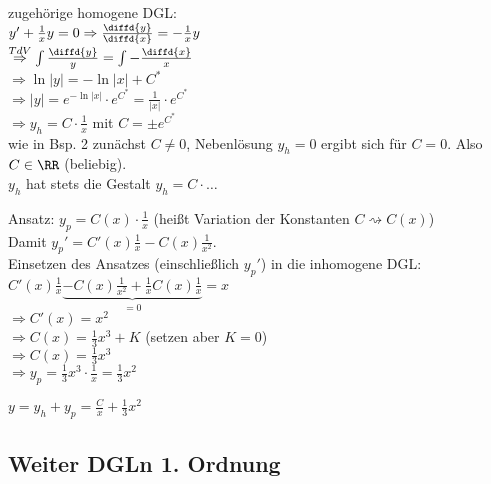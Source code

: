 \begin{anumerate}
\item zugehörige homogene DGL:\\
$y'+\frac{1}{x}y=0 \Rightarrow \frac{\diffd{y}}{\diffd{x}}=-\frac{1}{x}y$\\
$\overset{TdV}{\Rightarrow} \int \frac{\diffd{y}}{y}=\int - \frac{\diffd{x}}{x}$\\
$\Rightarrow \ln |y| = - \ln | x | + C^*$\\
$\Rightarrow |y| = e^{-\ln |x|}\cdot e^{C^*}=\frac{1}{|x|}\cdot e^{C^*}$\\
$\Rightarrow y_h = C\cdot \frac{1}{x}$ mit $C = \pm e^{C^*}$\\
wie in Bsp. 2 zunächst $C\not = 0$, Nebenlösung $y_h=0$ ergibt sich für $C=0$. Also $C\in \RR$ (beliebig).\\
$y_h$ hat stets die Gestalt $\boxed{y_h=C\cdot \dots}$
\item Ansatz: $y_p=C(x) \cdot \frac{1}{x}$ (heißt Variation der Konstanten $C \rightsquigarrow C(x)$)\\
Damit $y_p'=C'(x)\frac{1}{x}-C(x) \frac{1}{x^2}$.\\
Einsetzen des Ansatzes (einschließlich $y_p'$) in die inhomogene DGL:\\
$C'(x)\frac{1}{x}\underbrace{-C(x)\frac{1}{x^2}+\frac{1}{x}C(x)\frac{1}{x}}_{=0}=x$\\
$\Rightarrow C'(x)=x^2$\\
$\Rightarrow C(x) = \frac{1}{3}x^3+K$ (setzen aber $K=0$)\\
$\Rightarrow C(x) = \frac{1}{3}x^3$\\
$\Rightarrow y_p = \frac{1}{3}x^3\cdot \frac{1}{x}=\frac{1}{3}x^2$
\item $y=y_h+y_p=\frac{C}{x}+\frac{1}{3}x^2$
\end{anumerate}

\subsection{Weiter DGLn 1. Ordnung}
